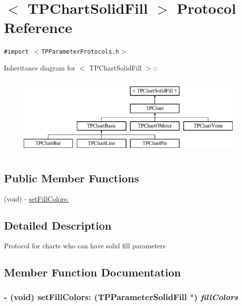 \hypertarget{protocol_t_p_chart_solid_fill-p}{
\section{$<$ TPChartSolidFill $>$ Protocol Reference}
\label{protocol_t_p_chart_solid_fill-p}
}
{\tt \#import $<$TPParameterProtocols.h$>$}

Inheritance diagram for $<$ TPChartSolidFill $>$::\begin{figure}[H]
\begin{center}
\leavevmode
\includegraphics[height=4cm]{protocol_t_p_chart_solid_fill-p}
\end{center}
\end{figure}
\subsection*{Public Member Functions}
\begin{CompactItemize}
\item 
(void) - \hyperlink{protocol_t_p_chart_solid_fill-p_6e76d20ece19c4a545c530ae19cf39c7}{setFillColors:}
\end{CompactItemize}


\subsection{Detailed Description}
Protocol for charts who can have solid fill parameters 

\subsection{Member Function Documentation}
\hypertarget{protocol_t_p_chart_solid_fill-p_6e76d20ece19c4a545c530ae19cf39c7}{
\subsubsection[{setFillColors:}]{\setlength{\rightskip}{0pt plus 5cm}- (void) setFillColors: ({\bf TPParameterSolidFill} $\ast$) {\em fillColors}}}
\label{protocol_t_p_chart_solid_fill-p_6e76d20ece19c4a545c530ae19cf39c7}



